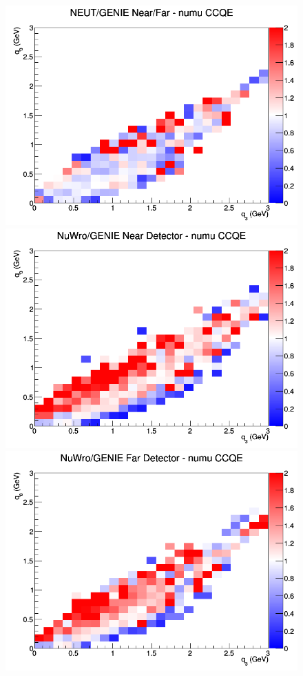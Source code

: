 \begin{figure}[h]
\endminipage
{}
\includegraphics[width=\linewidth]{eff_q0_q3/GAr/ratios/CCQE_NEUT_GENIE_numu_NF_q3_q0.png}
\endminipage
\newline
{}
\includegraphics[width=\linewidth]{eff_q0_q3/GAr/ratios/CCQE_NuWro_GENIE_numu_near_q3_q0.png}
\endminipage
{}
\includegraphics[width=\linewidth]{eff_q0_q3/GAr/ratios/CCQE_NuWro_GENIE_numu_far_q3_q0.png}

\end{figure}
